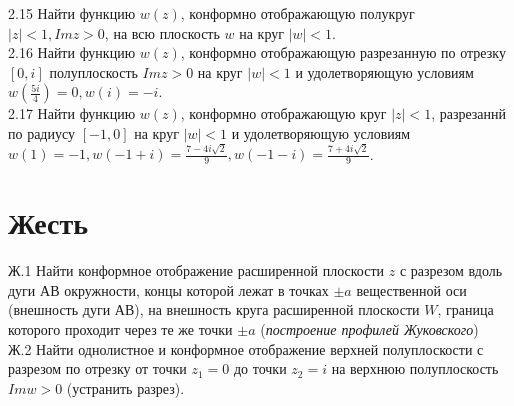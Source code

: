\documentclass{article}
\begin{document}
2.15 Найти функцию $w(z)$, конформно отображающую полукруг $\vert z \vert < 1, Im {z}>0$, на всю плоскость $w$ на круг $\vert w \vert < 1$. \\
2.16 Найти функцию $w(z)$, конформно отображающую разрезанную по отрезку $[0, i]$ полуплоскость $Im {z}>0$  на круг $\vert w \vert < 1$ и удолетворяющую условиям $w(\frac{5i}{4})=0, w(i)=-i$.\\
2.17 Найти функцию $w(z)$, конформно отображающую круг $\vert z \vert < 1$, разрезаннй по радиусу $[-1, 0]$ на круг $\vert w \vert < 1$ и удолетворяющую условиям $w(1)=-1, w(-1+i)=\frac{7-4i\sqrt{2}}{9}, w(-1-i)=\frac{7+4i\sqrt{2}}{9}$.\\


\section{Жесть}
Ж.1 Найти конформное отображение расширенной плоскости $z$ с разрезом вдоль дуги АВ окружности, концы которой лежат в точках $\pm a$ вещественной оси (внешность дуги АВ), на внешность круга расширенной плоскости $W$, граница которого проходит через те же точки $\pm a$ (\emph{построение профилей Жуковского})\\
Ж.2 Найти однолистное и конформное отображение верхней полуплоскости с разрезом по отрезку от точки $z_1 = 0$ до точки $z_2 = i$ на верхнюю полуплоскость $Im w > 0$ (устранить разрез).
\end{document}
